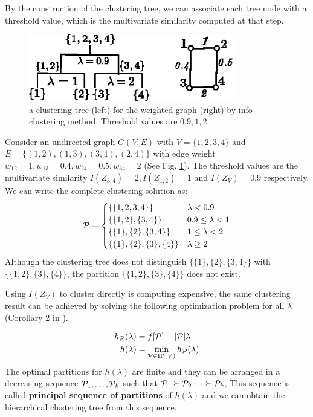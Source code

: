 \documentclass{article}
\begin{document}
By the construction of the clustering tree, we can associate each tree node with a threshold value, which is the multivariate similarity computed at that step.
\begin{example}
\begin{figure}
\centering
\includegraphics[width=0.8\textwidth]{pic/threshold.eps}
\caption{a clustering tree (left) for the weighted graph (right) by info-clustering method. Threshold values are $0.9, 1, 2$.}\label{fig:threshold}
\end{figure}
Consider an undirected graph $G(V, E)$ with $V=\{1,2,3,4\}$ and $E=\{(1,2),(1,3),(3,4),(2,4)\}$ with edge weight $w_{12}=1,w_{13}=0.4,w_{24}=0.5,w_{34}=2$ (See Fig. \ref{fig:threshold}). The threshold values are the multivariate similarity $I(Z_{3,4})=2, I(Z_{1,2})=1$ and $I(Z_V)=0.9$ respectively. We can write the complete clustering solution as:
\begin{equation*}
\P = 
\begin{cases}
\{\{1,2,3,4\}\} & \lambda < 0.9 \\
\{\{1,2\},\{3,4\}\} & 0.9 \leq \lambda < 1 \\
\{\{1\},\{2\},\{3,4\}\} & 1 \leq \lambda < 2\\
\{\{1\},\{2\},\{3\},\{4\}\} & \lambda \geq 2
\end{cases}
\end{equation*}
Although the clustering tree does not distinguish $\{\{1\},\{2\},\{3,4\}\}$ with $\{\{1,2\},\{3\}, \{4\}\}$, the partition $\{\{1,2\},\{3\}, \{4\}\}$ does not exist.
\end{example}
Using $I(Z_V)$ to cluster directly is computing expensive, the same clustering result can be achieved by solving the following optimization problem for all $\lambda$ (Corollary 2 in \cite{RN1}).
\begin{theorem}\label{thm:psp}
\begin{align}\label{eq:hL}
h_{\P}(\lambda) &=  f[\P] - \abs{\P} \lambda  \\
h(\lambda) &= \min_{\P \in \Pi'(V)} h_{\P}(\lambda)
\end{align}
The optimal partitions for $h(\lambda)$ are finite and they can be arranged in a decreasing sequence $\P_1, \dots, \P_k$ such that $\P_1 \succeq \P_2 \dots \succeq \P_k$, This sequence is called \textbf{principal sequence of partitions} of $h(\lambda)$ and we can obtain the hierarchical clustering tree from this sequence.
\end{theorem}
\end{document}
